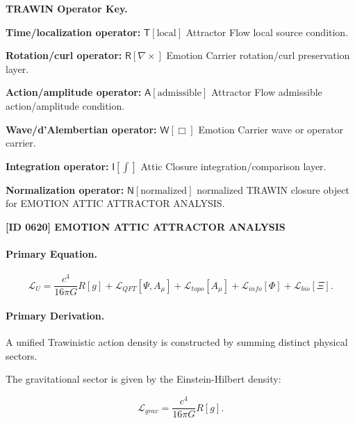 \par\vspace{0.45\baselineskip}
\noindent\begin{minipage}[t]{\linewidth}
\begingroup
\small
\raggedright
\textbf{TRAWIN Operator Key.}\par
\noindent\textbf{Time/localization operator:} $\mathsf{T}\!\left[\mathrm{local}\right]$ Attractor Flow local source condition.\par
\noindent\textbf{Rotation/curl operator:} $\mathsf{R}\!\left[\nabla\times\right]$ Emotion Carrier rotation/curl preservation layer.\par
\noindent\textbf{Action/amplitude operator:} $\mathsf{A}\!\left[\mathrm{admissible}\right]$ Attractor Flow admissible action/amplitude condition.\par
\noindent\textbf{Wave/d'Alembertian operator:} $\mathsf{W}\!\left[\Box\right]$ Emotion Carrier wave or operator carrier.\par
\noindent\textbf{Integration operator:} $\mathsf{I}\!\left[\int\right]$ Attic Closure integration/comparison layer.\par
\noindent\textbf{Normalization operator:} $\mathsf{N}\!\left[\mathrm{normalized}\right]$ normalized TRAWIN closure object for EMOTION ATTIC ATTRACTOR ANALYSIS.\par
\endgroup
\end{minipage}

\clearpage
\noindent\textbf{[ID 0620] EMOTION ATTIC ATTRACTOR ANALYSIS}\par
\vspace{0.35em}
\paragraph{Primary Equation.}
\begin{equation}
\mathcal{L}_U
=
\frac{c^4}{16\pi G}R[g]
+
\mathcal{L}_{QFT}[\Psi,A_\mu]
+
\mathcal{L}_{topo}[A_\mu]
+
\mathcal{L}_{info}[\Phi]
+
\mathcal{L}_{bio}[\Xi].
\end{equation}

\paragraph{Primary Derivation.}
A unified Trawinistic action density is constructed by summing distinct physical sectors.

The gravitational sector is given by the Einstein-Hilbert density:

\begin{equation}
\mathcal{L}_{grav}
=
\frac{c^4}{16\pi G}R[g].
\end{equation}

